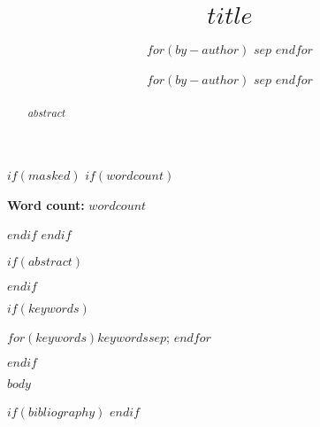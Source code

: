 \documentclass[
    a4paper,
    man,
    floatsintext,
	lucida
]{glossaPX2}
\title[$shorttitle$]{$title$}
\author[]{}%
\author[]{
    $for(by-author)$
    \spauthor{
    $by-author.name.literal$\\
    $if(by-author.affiliations)$
      $for(by-author.affiliations)$
        \institute{$by-author.affiliations.name$}\\
      $endfor$
    $endif$
    $if(by-author.email)$
      \small{$by-author.email$\\}
    $endif$
    $if(by-author.orcid)$
      \small{ORCID: $by-author.orcid$}
    $endif$
    }
    $sep$ \AND
    $endfor$
    }
\author[]{
  $for(by-author)$
  \spauthor{
  $by-author.name.literal$\\
  $if(by-author.affiliations)$
    $for(by-author.affiliations)$
      \institute{$by-author.affiliations.name$}\\
    $endfor$
  $endif$
  $if(by-author.email)$
    \small{$by-author.email$\\}
  $endif$
  $if(by-author.orcid)$
    \small{ORCID: $by-author.orcid$}
  $endif$
  }
  $sep$ \AND
  $endfor$
  }
\begin{document}
\maketitle

$if(masked)$
  $if(wordcount)$
\begin{center}
\textbf{Word count:} $wordcount$
\end{center}
  $endif$
$endif$


$if(abstract)$
\begin{abstract}
$abstract$
\end{abstract}
$endif$

$if(keywords)$
\begin{keywords}
$for(keywords)$$keywords$$sep$; $endfor$
\end{keywords}
$endif$

$body$

$if(bibliography)$
\printbibliography
$endif$
\end{document}

